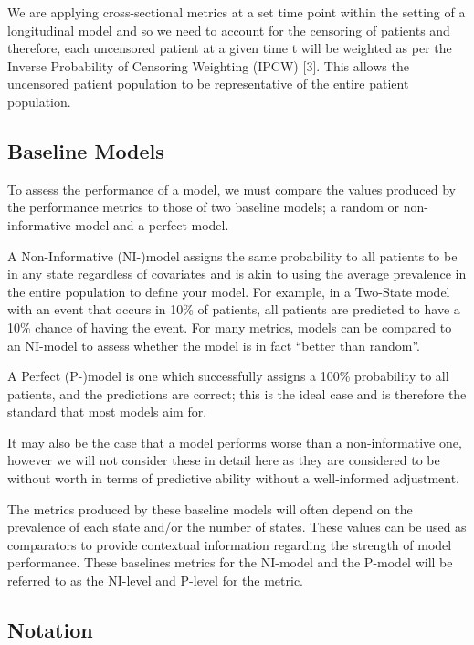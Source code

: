 \documentclass[12pt,PhD,twoside,openright]{muthesis}
\begin{document}
We are applying cross-sectional metrics at a set time point within the setting of a longitudinal model and so we need to account for the censoring of patients and therefore, each uncensored patient at a given time t will be weighted as per the Inverse Probability of Censoring Weighting (IPCW) {[}3{]}. This allows the uncensored patient population to be representative of the entire patient population.

\hypertarget{baseline-models}{%
\subsection{Baseline Models}\label{baseline-models}}

To assess the performance of a model, we must compare the values produced by the performance metrics to those of two baseline models; a random or non-informative model and a perfect model.

A Non-Informative (NI-)model assigns the same probability to all patients to be in any state regardless of covariates and is akin to using the average prevalence in the entire population to define your model. For example, in a Two-State model with an event that occurs in 10\% of patients, all patients are predicted to have a 10\% chance of having the event. For many metrics, models can be compared to an NI-model to assess whether the model is in fact ``better than random''.

A Perfect (P-)model is one which successfully assigns a 100\% probability to all patients, and the predictions are correct; this is the ideal case and is therefore the standard that most models aim for.

It may also be the case that a model performs worse than a non-informative one, however we will not consider these in detail here as they are considered to be without worth in terms of predictive ability without a well-informed adjustment.

The metrics produced by these baseline models will often depend on the prevalence of each state and/or the number of states. These values can be used as comparators to provide contextual information regarding the strength of model performance. These baselines metrics for the NI-model and the P-model will be referred to as the NI-level and P-level for the metric.

\hypertarget{notation}{%
\subsection{Notation}\label{notation}}
\end{document}
